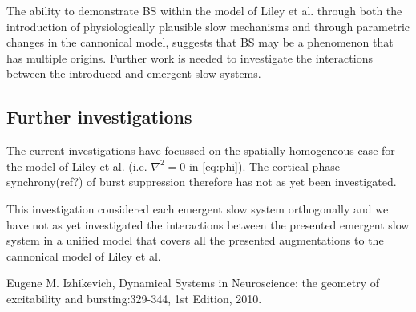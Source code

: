 \documentclass[a4paper,12pt]{article}
\begin{document}
The ability to demonstrate BS within the model of Liley et al. through both the introduction of physiologically
plausible slow mechanisms and through parametric changes in the cannonical model, suggests that BS may be a phenomenon that has multiple origins. Further work is needed to investigate the interactions
between the introduced and emergent slow systems.

\subsection{Further investigations}
The current investigations have focussed on the spatially homogeneous case for the model of Liley et al. (i.e. $\nabla^2 =
0$ in \ref{eq:phi}). The cortical phase synchrony(ref?) of burst suppression therefore has not as yet been investigated.

This investigation considered each emergent slow system orthogonally and we have not as yet investigated the
interactions between the presented emergent slow system in a unified model that covers all the presented augmentations to the cannonical model of Liley et al.


\begin{thebibliography}{999}

  Eugene M. Izhikevich,
  Dynamical Systems in Neuroscience: the geometry of excitability and bursting:329-344,
  1st Edition,
  2010.

\end{thebibliography}
\end{document}
